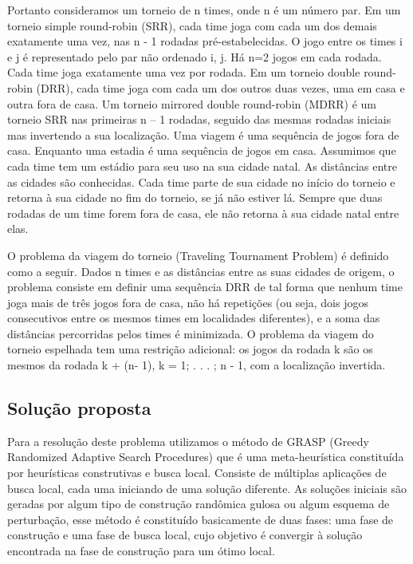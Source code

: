 \documentclass[12pt,a4paper]{article}
\begin{document}
Portanto consideramos um torneio de n times, onde n é um número par. Em um torneio simple round-robin (SRR), cada time joga com cada um dos demais exatamente uma vez, nas n - 1 rodadas pré-estabelecidas. O jogo entre os times i e j é representado pelo par não ordenado i, j. Há n=2 jogos em cada rodada. Cada time joga exatamente uma vez por rodada. Em um torneio double round-robin (DRR), cada time joga com cada um dos outros duas vezes, uma em casa e outra fora de casa. Um torneio mirrored double round-robin (MDRR) é um torneio SRR nas primeiras n – 1 rodadas, seguido das mesmas rodadas iniciais mas invertendo a sua localização. Uma viagem é uma sequência de jogos fora de casa. Enquanto uma estadia é uma sequência de jogos em casa. Assumimos que cada time tem um estádio para seu uso na sua cidade natal. As distâncias entre as cidades são conhecidas. Cada time parte de sua cidade no início do torneio e retorna à sua cidade no fim do torneio, se já não estiver lá. Sempre que duas rodadas de um time forem fora de casa, ele não retorna à sua cidade natal entre elas. 

O problema da viagem do torneio (Traveling Tournament Problem) é definido como a seguir. Dados n times e as distâncias entre as suas cidades de origem, o problema consiste em definir uma sequência DRR de tal forma que nenhum time joga mais de três jogos fora de casa, não há repetições (ou seja, dois jogos consecutivos entre os mesmos times em localidades diferentes), e a soma das distâncias percorridas pelos times é minimizada. O problema da viagem do torneio espelhada tem uma restrição adicional: os jogos da rodada k são os mesmos da rodada k + (n- 1), k = 1; . . . ; n - 1, com a localização invertida.

\subsection{Solução proposta}

Para a resolução deste problema utilizamos o método de GRASP (Greedy Randomized Adaptive Search Procedures) que é uma meta-heurística constituída por heurísticas construtivas e busca local. Consiste de múltiplas aplicações de busca local, cada uma iniciando de uma solução diferente. As soluções iniciais são geradas por algum tipo de construção randômica gulosa ou algum esquema de perturbação, esse método é constituído basicamente de duas fases: uma fase de construção e uma fase de busca local, cujo objetivo é convergir à solução encontrada na fase de construção para um ótimo local.
\end{document}
